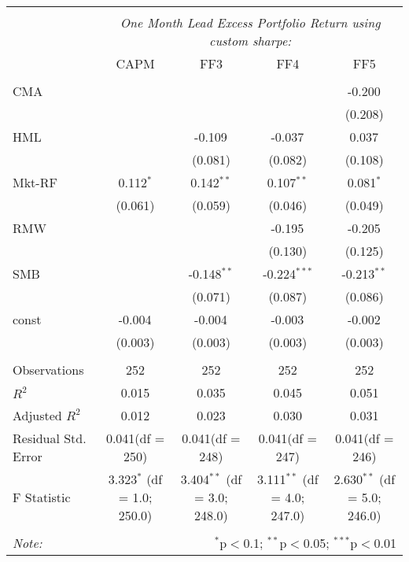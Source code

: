 \begin{table}[!htbp] \centering
\begin{tabular}{@{\extracolsep{5pt}}lcccc}
\\[-1.8ex]\hline
\hline \\[-1.8ex]
& \multicolumn{4}{c}{\textit{One Month Lead Excess Portfolio Return using custom sharpe:}} \
\cr \cline{4-5}
\\[-1.8ex] & CAPM & FF3 & FF4 & FF5 \\
\hline \\[-1.8ex]
 CMA & & & & -0.200$^{}$ \\
  & & & & (0.208) \\
 HML & & -0.109$^{}$ & -0.037$^{}$ & 0.037$^{}$ \\
  & & (0.081) & (0.082) & (0.108) \\
 Mkt-RF & 0.112$^{*}$ & 0.142$^{**}$ & 0.107$^{**}$ & 0.081$^{*}$ \\
  & (0.061) & (0.059) & (0.046) & (0.049) \\
 RMW & & & -0.195$^{}$ & -0.205$^{}$ \\
  & & & (0.130) & (0.125) \\
 SMB & & -0.148$^{**}$ & -0.224$^{***}$ & -0.213$^{**}$ \\
  & & (0.071) & (0.087) & (0.086) \\
 const & -0.004$^{}$ & -0.004$^{}$ & -0.003$^{}$ & -0.002$^{}$ \\
  & (0.003) & (0.003) & (0.003) & (0.003) \\
\hline \\[-1.8ex]
 Observations & 252 & 252 & 252 & 252 \\
 $R^2$ & 0.015 & 0.035 & 0.045 & 0.051 \\
 Adjusted $R^2$ & 0.012 & 0.023 & 0.030 & 0.031 \\
 Residual Std. Error & 0.041(df = 250) & 0.041(df = 248) & 0.041(df = 247) & 0.041(df = 246)  \\
 F Statistic & 3.323$^{*}$ (df = 1.0; 250.0) & 3.404$^{**}$ (df = 3.0; 248.0) & 3.111$^{**}$ (df = 4.0; 247.0) & 2.630$^{**}$ (df = 5.0; 246.0) \\
\hline
\hline \\[-1.8ex]
\textit{Note:} & \multicolumn{4}{r}{$^{*}$p$<$0.1; $^{**}$p$<$0.05; $^{***}$p$<$0.01} \\
\end{tabular}
\end{table}
